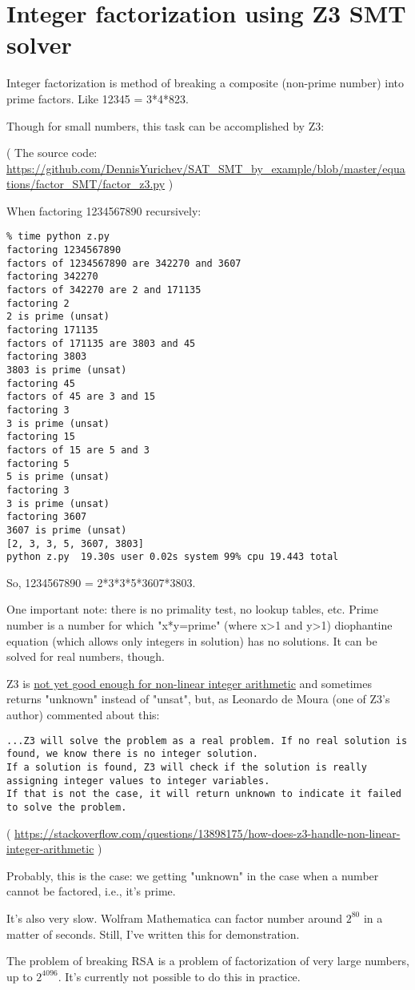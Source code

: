 \section{Integer factorization using Z3 SMT solver}
\label{factor_Z3}

Integer factorization is method of breaking a composite (non-prime number) into prime factors.
Like 12345 = 3*4*823.

Though for small numbers, this task can be accomplished by Z3:



( The source code: \url{https://github.com/DennisYurichev/SAT_SMT_by_example/blob/master/equations/factor_SMT/factor_z3.py} )

When factoring 1234567890 recursively:

\begin{lstlisting}
% time python z.py
factoring 1234567890
factors of 1234567890 are 342270 and 3607
factoring 342270
factors of 342270 are 2 and 171135
factoring 2
2 is prime (unsat)
factoring 171135
factors of 171135 are 3803 and 45
factoring 3803
3803 is prime (unsat)
factoring 45
factors of 45 are 3 and 15
factoring 3
3 is prime (unsat)
factoring 15
factors of 15 are 5 and 3
factoring 5
5 is prime (unsat)
factoring 3
3 is prime (unsat)
factoring 3607
3607 is prime (unsat)
[2, 3, 3, 5, 3607, 3803]
python z.py  19.30s user 0.02s system 99% cpu 19.443 total
\end{lstlisting}

So, 1234567890 = 2*3*3*5*3607*3803.

One important note: there is no primality test, no lookup tables, etc.
Prime number is a number for which "x*y=prime" (where x>1 and y>1) diophantine equation (which allows only integers in solution) has no solutions.
It can be solved for real numbers, though.

Z3 is \href{https://github.com/Z3Prover/z3/issues/1264}{not yet good enough for non-linear integer arithmetic}
and sometimes returns "unknown" instead of "unsat", but,
as Leonardo de Moura (one of Z3's author) commented about this:

\begin{lstlisting}
...Z3 will solve the problem as a real problem. If no real solution is found, we know there is no integer solution.
If a solution is found, Z3 will check if the solution is really assigning integer values to integer variables.
If that is not the case, it will return unknown to indicate it failed to solve the problem.
\end{lstlisting}
( \url{https://stackoverflow.com/questions/13898175/how-does-z3-handle-non-linear-integer-arithmetic} )

Probably, this is the case: we getting "unknown" in the case when a number cannot be factored, i.e., it's prime.

It's also very slow. Wolfram Mathematica can factor number around $2^{80}$ in a matter of seconds.
Still, I've written this for demonstration.

The problem of breaking \ac{RSA} is a problem of factorization of very large numbers, up to $2^{4096}$.
It's currently not possible to do this in practice.

